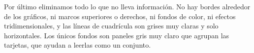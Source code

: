 Por último eliminamos todo lo que no lleva información. No hay bordes alrededor de los gráficos,
ni marcos superiores o derechos, ni fondos de color, ni efectos tridimensionales, y las líneas
de cuadrícula son grises muy claras y solo horizontales. Los únicos fondos son paneles gris muy
claro que agrupan las tarjetas, que ayudan a leerlas como un conjunto.
